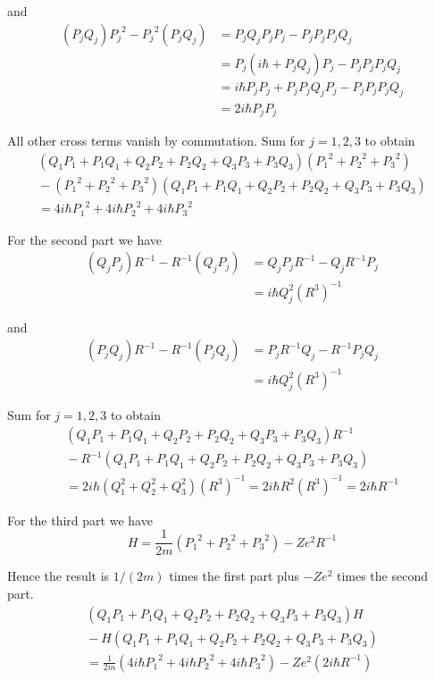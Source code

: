 and
\begin{align*}
(P_jQ_j){P_j}^2-{P_j}^2(P_jQ_j)
&=P_jQ_jP_jP_j-P_jP_jP_jQ_j
\\
&=P_j(i\hbar+P_jQ_j)P_j-P_jP_jP_jQ_j
\\
&=i\hbar P_jP_j+P_jP_jQ_jP_j-P_jP_jP_jQ_j
\\
&=2i\hbar P_jP_j
\end{align*}

All other cross terms vanish by commutation.
Sum for $j=1,2,3$ to obtain
\begin{multline*}
(Q_1P_1+P_1Q_1+Q_2P_2+P_2Q_2+Q_3P_3+P_3Q_3)({P_1}^2+{P_2}^2+{P_3}^2)
\\
{}-({P_1}^2+{P_2}^2+{P_3}^2)(Q_1P_1+P_1Q_1+Q_2P_2+P_2Q_2+Q_3P_3+P_3Q_3)
\\
{}=4i\hbar{P_1}^2+4i\hbar{P_2}^2+4i\hbar{P_3}^2
\end{multline*}

For the second part we have
\begin{align*}
(Q_jP_j)R^{-1}-R^{-1}(Q_jP_j)
&=Q_jP_jR^{-1}-Q_jR^{-1}P_j
\\
&=i\hbar Q_j^2(R^3)^{-1}
\end{align*}

and
\begin{align*}
(P_jQ_j)R^{-1}-R^{-1}(P_jQ_j)
&=P_jR^{-1}Q_j-R^{-1}P_jQ_j
\\
&=i\hbar Q_j^2(R^3)^{-1}
\end{align*}

Sum for $j=1,2,3$ to obtain
\begin{multline*}
(Q_1P_1+P_1Q_1+Q_2P_2+P_2Q_2+Q_3P_3+P_3Q_3)R^{-1}
\\
{}-R^{-1}(Q_1P_1+P_1Q_1+Q_2P_2+P_2Q_2+Q_3P_3+P_3Q_3)
\\
{}=2i\hbar(Q_1^2+Q_2^2+Q_3^2)(R^3)^{-1}=2i\hbar R^2(R^3)^{-1}=2i\hbar R^{-1}
\end{multline*}

For the third part we have
\begin{equation*}
H=\frac{1}{2m}\left({P_1}^2+{P_2}^2+{P_3}^2\right)-Ze^2R^{-1}
\end{equation*}

Hence the result is $1/(2m)$ times the first part plus $-Ze^2$ times the second part.
\begin{multline*}
(Q_1P_1+P_1Q_1+Q_2P_2+P_2Q_2+Q_3P_3+P_3Q_3)H
\\
{}-H(Q_1P_1+P_1Q_1+Q_2P_2+P_2Q_2+Q_3P_3+P_3Q_3)
\\
{}=\frac{1}{2m}\left(4i\hbar{P_1}^2+4i\hbar{P_2}^2+4i\hbar{P_3}^2\right)
-Ze^2\left(2i\hbar R^{-1}\right)
\end{multline*}


